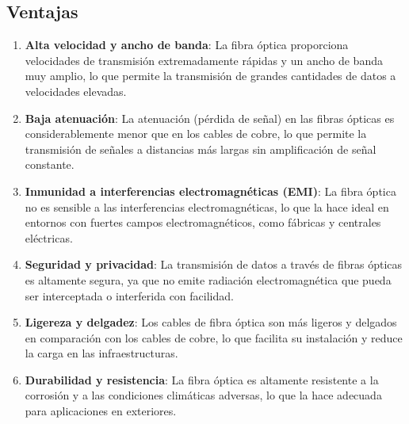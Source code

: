\documentclass[
	12pt, %
	fleqn, %
	a4paper, %
	oneside, %
]{LegrandOrangeBook}
\begin{document}
\subsection{Ventajas}
\begin{enumerate}
\item \textbf{Alta velocidad y ancho de banda}: La fibra óptica proporciona velocidades de transmisión extremadamente rápidas y un ancho de banda muy amplio, lo que permite la transmisión de grandes cantidades de datos a velocidades elevadas.

\item \textbf{Baja atenuación}: La atenuación (pérdida de señal) en las fibras ópticas es considerablemente menor que en los cables de cobre, lo que permite la transmisión de señales a distancias más largas sin amplificación de señal constante.

\item \textbf{Inmunidad a interferencias electromagnéticas (EMI)}: La fibra óptica no es sensible a las interferencias electromagnéticas, lo que la hace ideal en entornos con fuertes campos electromagnéticos, como fábricas y centrales eléctricas.

\item \textbf{Seguridad y privacidad}: La transmisión de datos a través de fibras ópticas es altamente segura, ya que no emite radiación electromagnética que pueda ser interceptada o interferida con facilidad.

\item \textbf{Ligereza y delgadez}: Los cables de fibra óptica son más ligeros y delgados en comparación con los cables de cobre, lo que facilita su instalación y reduce la carga en las infraestructuras.

\item \textbf{Durabilidad y resistencia}: La fibra óptica es altamente resistente a la corrosión y a las condiciones climáticas adversas, lo que la hace adecuada para aplicaciones en exteriores.
\end{enumerate}
\end{document}
